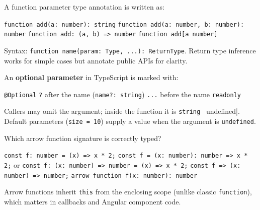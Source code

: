 \question[4]
A function parameter type annotation is written as:
\begin{choices}
  \choice \lstinline[style=tsinline]|function add(a: number): string|
  \CorrectChoice \lstinline[style=tsinline]|function add(a: number, b: number): number|
  \choice \lstinline[style=tsinline]|function add: (a, b) => number|
  \choice \lstinline[style=tsinline]|function add[a number]|
\end{choices}
\begin{solution}
  Syntax: \lstinline[style=tsinline]|function name(param: Type, ...): ReturnType|. Return type inference works for simple cases but annotate public APIs for clarity.
\end{solution}

\question[4]
An \textbf{optional parameter} in TypeScript is marked with:
\begin{choices}
  \choice \lstinline[style=tsinline]|@Optional|
  \CorrectChoice \lstinline[style=tsinline]|?| after the name (\lstinline[style=tsinline]|name?: string|)
  \choice \lstinline[style=tsinline]|...| before the name
  \choice \lstinline[style=tsinline]|readonly|
\end{choices}
\begin{solution}
  Callers may omit the argument; inside the function it is \lstinline[style=tsinline]|string | undefined|. Default parameters (\lstinline[style=tsinline]|size = 10|) supply a value when the argument is \lstinline[style=tsinline]|undefined|.
\end{solution}

\question[4]
Which arrow function signature is correctly typed?
\begin{choices}
  \choice \lstinline[style=tsinline]|const f: number = (x) => x * 2;|
  \CorrectChoice \lstinline[style=tsinline]|const f = (x: number): number => x * 2;| or \lstinline[style=tsinline]|const f: (x: number) => number = (x) => x * 2;|
  \choice \lstinline[style=tsinline]|const f => (x: number) => number;|
  \choice \lstinline[style=tsinline]|arrow function f(x: number): number|
\end{choices}
\begin{solution}
  Arrow functions inherit \lstinline[style=tsinline]|this| from the enclosing scope (unlike classic \lstinline[style=tsinline]|function|), which matters in callbacks and Angular component code.
\end{solution}

